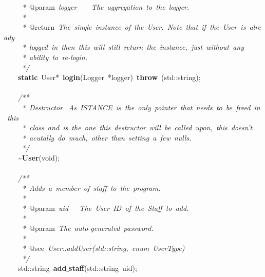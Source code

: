 \mbox{}\textit{\ \ \ \ \ *\ }@param\textit{\ logger\ \ \ \ The\ aggregation\ to\ the\ logger.} \\
\mbox{}\textit{\ \ \ \ \ *} \\
\mbox{}\textit{\ \ \ \ \ *\ }@return\textit{\ The\ single\ instance\ of\ the\ User.\ Note\ that\ if\ the\ User\ is\ already} \\
\mbox{}\textit{\ \ \ \ \ *\ logged\ in\ then\ this\ will\ still\ return\ the\ instance,\ just\ without\ any} \\
\mbox{}\textit{\ \ \ \ \ *\ ability\ to\ re-login.} \\
\mbox{}\textit{\ \ \ \ \ */} \\
\mbox{}\ \ \ \ \textbf{static}\ User*\ \textbf{login}(Logger\ *logger)\ \textbf{throw}\ (std::string); \\
\mbox{} \\
\mbox{}\ \ \ \ \textit{/**} \\
\mbox{}\textit{\ \ \ \ \ *\ Destructor.\ As\ ISTANCE\ is\ the\ only\ pointer\ that\ needs\ to\ be\ freed\ in\ this} \\
\mbox{}\textit{\ \ \ \ \ *\ class\ and\ is\ the\ one\ this\ destructor\ will\ be\ called\ upon,\ this\ doesn't} \\
\mbox{}\textit{\ \ \ \ \ *\ acutally\ do\ much,\ other\ than\ setting\ a\ few\ nulls.} \\
\mbox{}\textit{\ \ \ \ \ */} \\
\mbox{}\ \ \ \ \textasciitilde{}\textbf{User}(void); \\
\mbox{} \\
\mbox{}\ \ \ \ \textit{/**} \\
\mbox{}\textit{\ \ \ \ \ *\ Adds\ a\ member\ of\ staff\ to\ the\ program.} \\
\mbox{}\textit{\ \ \ \ \ *} \\
\mbox{}\textit{\ \ \ \ \ *\ }@param\textit{\ uid\ \ \ The\ User\ ID\ of\ the\ Staff\ to\ add.} \\
\mbox{}\textit{\ \ \ \ \ *} \\
\mbox{}\textit{\ \ \ \ \ *\ }@param\textit{\ The\ auto-generated\ password.} \\
\mbox{}\textit{\ \ \ \ \ *} \\
\mbox{}\textit{\ \ \ \ \ *\ }@see\textit{\ User::addUser(std::string,\ enum\ UserType)} \\
\mbox{}\textit{\ \ \ \ \ */} \\
\mbox{}\ \ \ \ std::string\ \textbf{add$\_$staff}(std::string\ uid); \\
